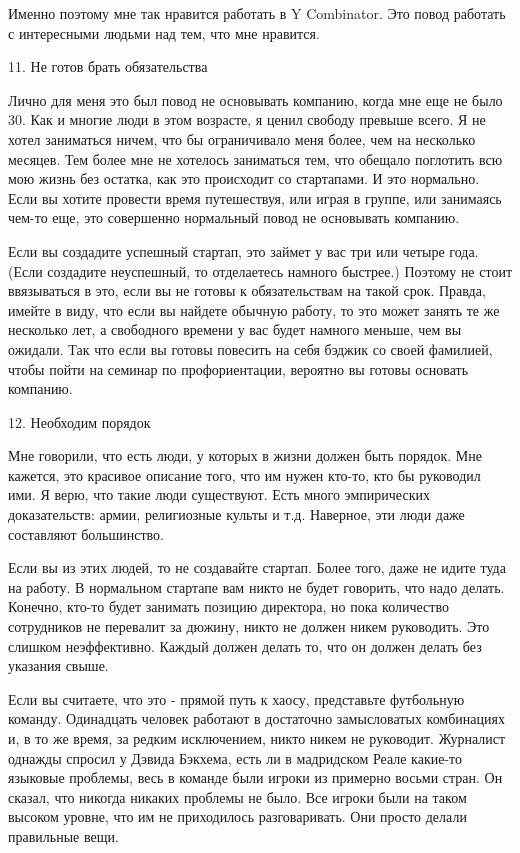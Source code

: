 \documentclass[ebook,12pt,oneside,openany]{memoir}
\begin{document}
Именно поэтому мне так нравится работать в Y Combinator. Это повод
работать с интересными людьми над тем, что мне нравится.

11. Не готов брать обязательства

Лично для меня это был повод не основывать компанию, когда мне еще не
было 30. Как и многие люди в этом возрасте, я ценил свободу превыше
всего. Я не хотел заниматься ничем, что бы ограничивало меня более,
чем на несколько месяцев. Тем более мне не хотелось заниматься тем,
что обещало поглотить всю мою жизнь без остатка, как это происходит со
стартапами. И это нормально. Если вы хотите провести время
путешествуя, или играя в группе, или занимаясь чем-то еще, это
совершенно нормальный повод не основывать компанию.

Если вы создадите успешный стартап, это займет у вас три или четыре
года. (Если создадите неуспешный, то отделаетесь намного быстрее.)
Поэтому не стоит ввязываться в это, если вы не готовы к обязательствам
на такой срок. Правда, имейте в виду, что если вы найдете обычную
работу, то это может занять те же несколько лет, а свободного времени
у вас будет намного меньше, чем вы ожидали. Так что если вы готовы
повесить на себя бэджик со своей фамилией, чтобы пойти на семинар по
профориентации, вероятно вы готовы основать компанию.

12. Необходим порядок

Мне говорили, что есть люди, у которых в жизни должен быть порядок.
Мне кажется, это красивое описание того, что им нужен кто-то, кто бы
руководил ими. Я верю, что такие люди существуют. Есть много
эмпирических доказательств: армии, религиозные культы и т.д. Наверное,
эти люди даже составляют большинство.

Если вы из этих людей, то не создавайте стартап. Более того, даже не
идите туда на работу. В нормальном стартапе вам никто не будет
говорить, что надо делать. Конечно, кто-то будет занимать позицию
директора, но пока количество сотрудников не перевалит за дюжину,
никто не должен никем руководить. Это слишком неэффективно. Каждый
должен делать то, что он должен делать без указания свыше.

Если вы считаете, что это - прямой путь к хаосу, представьте
футбольную команду. Одинадцать человек работают в достаточно
замысловатых комбинациях и, в то же время, за редким исключением,
никто никем не руководит. Журналист однажды спросил у Дэвида Бэкхема,
есть ли в мадридском Реале какие-то языковые проблемы, весь в команде
были игроки из примерно восьми стран. Он сказал, что никогда никаких
проблемы не было. Все игроки были на таком высоком уровне, что им не
приходилось разговаривать. Они просто делали правильные вещи.
\end{document}

